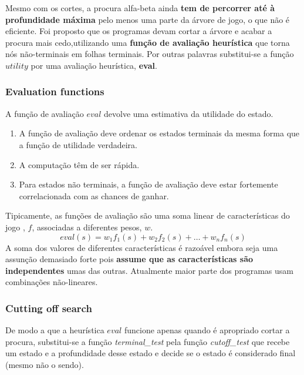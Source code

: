 \documentclass[11pt]{article}
\begin{document}
Mesmo com os cortes, a procura alfa-beta ainda \textbf{tem de percorrer até à profundidade máxima} pelo menos uma parte da árvore de jogo, o que não é eficiente. Foi proposto que os programas devam cortar a árvore e acabar a procura mais cedo,utilizando uma \textbf{função de avaliação heurística} que torna nós não-terminais em folhas terminais. Por outras palavras substitui-se a função $utility$ por uma avaliação heurística, \textbf{eval}.

\subsubsection{Evaluation functions}

A função de avaliação $eval$ devolve uma estimativa da utilidade do estado.
\begin{enumerate}[topsep=4pt, itemsep=0pt]
    \item A função de avaliação deve ordenar os estados terminais da mesma forma que a função de utilidade verdadeira.
    \item A computação têm de ser rápida.
    \item Para estados não terminais, a função de avaliação deve estar fortemente correlacionada com as chances de ganhar.
\end{enumerate}
\vspace{4pt}

Tipicamente, as funções de avaliação são uma soma linear de características do jogo , $f$, associadas a diferentes pesos, $w$.
\begin{equation*}
    eval(s) = w_1f_1(s)+w_2f_2(s)+\ldots+w_nf_n(s)
\end{equation*}
A soma dos valores de diferentes características é razoável embora seja uma assunção demasiado forte pois \textbf{assume que as características são independentes} umas das outras. Atualmente maior parte dos programas usam combinações não-lineares.

\subsubsection{Cutting off search}

De modo a que a heurística $eval$ funcione apenas quando é apropriado cortar a procura, substitui-se a função \textit{terminal\_test} pela função \textit{cutoff\_test} que recebe um estado e a profundidade desse estado e decide se o estado é considerado final (mesmo não o sendo).\vspace{4pt}
\end{document}
